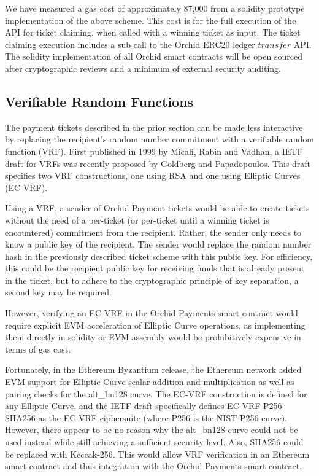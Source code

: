 We have measured a gas cost of approximately 87,000 from a solidity prototype implementation of the above scheme. This cost is for the full execution of the API for ticket claiming, when called with a winning ticket as input. The ticket claiming execution includes a sub call to the Orchid ERC20 ledger $transfer$ API. The solidity implementation of all Orchid smart contracts will be open sourced after cryptographic reviews and a minimum of external security auditing.

\subsection{Verifiable Random Functions}
\label{sec:vrfs}

The payment tickets described in the prior section can be made less interactive by replacing the recipient's random number commitment with a verifiable random function (VRF). First published in 1999 by Micali, Rabin and Vadhan\cite{VRF}, a IETF draft for VRFs was recently proposed by Goldberg and Papadopoulos\cite{IETFVRF}. This draft specifies two VRF constructions, one using RSA and one using Elliptic Curves (EC-VRF).

Using a VRF, a sender of Orchid Payment tickets would be able to create tickets without the need of a per-ticket (or per-ticket until a winning ticket is encountered) commitment from the recipient. Rather, the sender only needs to know a public key of the recipient. The sender would replace the random number hash in the previously described ticket scheme with this public key. For efficiency, this could be the recipient public key for receiving funds that is already present in the ticket, but to adhere to the cryptographic principle of key separation, a second key may be required.

However, verifying an EC-VRF in the Orchid Payments smart contract would require explicit EVM acceleration of Elliptic Curve operations, as implementing them directly in solidity or EVM assembly would be prohibitively expensive in terms of gas cost.

Fortunately, in the Ethereum Byzantium\cite{ETHByz} release, the Ethereum network added EVM support for Elliptic Curve scalar addition and multiplication\cite{EIP196} as well as pairing checks\cite{EIP197} for the alt\_bn128 curve\cite{ALTBN128}. The EC-VRF construction is defined for any Elliptic Curve, and the IETF draft specifically defines EC-VRF-P256-SHA256 as the EC-VRF ciphersuite (where P256 is the NIST-P256 curve\cite{P256}). However, there appear to be no reason why the alt\_bn128 curve could not be used instead while still achieving a sufficient security level. Also, SHA256 could be replaced with Keccak-256. This would allow VRF verification in an Ethereum smart contract and thus integration with the Orchid Payments smart contract.

